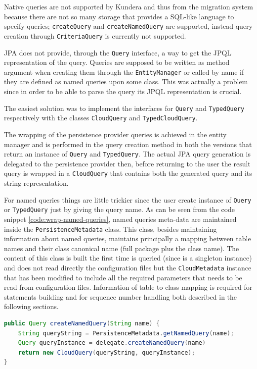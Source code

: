 \noindent Native queries are not supported by Kundera and thus from the migration system because there are not so many storage that provides a SQL-like language to specify queries; \texttt{createQuery} and \texttt{createNamedQuery} are supported, instead query creation through \texttt{CriteriaQuery} is currently not supported.

\newparagraph JPA does not provide, through the \texttt{Query} interface, a way to get the JPQL representation of the query. Queries are supposed to be written as method argument when creating them through the \texttt{EntityManager} or called by name if they are defined as named queries upon some class.
This was actually a problem since in order to be able to parse the query its JPQL representation is crucial.

\noindent The easiest solution was to implement the interfaces for \texttt{Query} and \texttt{TypedQuery} respectively with the classes \texttt{CloudQuery} and \texttt{TypedCloudQuery}. 

\noindent The wrapping of the persistence provider queries is achieved in the entity manager and is performed in the query creation method  in both the versions that return an instance of \texttt{Query} and \texttt{TypedQuery}. The actual JPA query generation is delegated to the persistence provider then, before returning to the user the result query is wrapped in a \texttt{CloudQuery} that contains both the generated query and its string representation.

\newparagraph For named queries things are little trickier since the user create instance of \texttt{Query} or \texttt{TypedQuery} just by giving the query name.
\noindent As can be seen from the code snippet \ref{code:wrap-named-queries}, named queries meta-data are maintained inside the \texttt{PersistenceMetadata} class. This class, besides maintaining information about named queries, maintains principally a mapping between table names and their class canonical name (full package plus the class name). The content of this class is built the first time is queried (since is a singleton instance) and does not read directly the  configuration files but the \texttt{CloudMetadata} instance that has been modified to include all the required parameters that needs to be read from configuration files. 
Information of table to class mapping is required for statements building and for sequence number handling both described in the following sections.

\begin{lstlisting}[language=Java, caption=Wrap named queries, label=code:wrap-named-queries]
public Query createNamedQuery(String name) {
    String queryString = PersistenceMetadata.getNamedQuery(name);
    Query queryInstance = delegate.createNamedQuery(name)
    return new CloudQuery(queryString, queryInstance);
}
\end{lstlisting}

